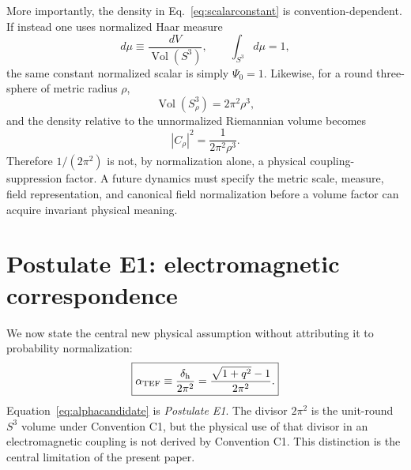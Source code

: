 \documentclass[10pt,twocolumn]{article}
\newcommand{\TEF}{\mathrm{TEF}}
\newcommand{\Vol}{\operatorname{Vol}}
\begin{document}
More importantly, the density in Eq.~\eqref{eq:scalarconstant} is convention-dependent.  If instead
one uses normalized Haar measure
\begin{equation}
d\mu\equiv\frac{dV}{\Vol(S^3)},
\qquad
\int_{S^3}d\mu=1,
\end{equation}
the same constant normalized scalar is simply $\Psi_0=1$.  Likewise, for a round three-sphere of
metric radius $\rho$,
\begin{equation}
\Vol(S^3_\rho)=2\pi^2\rho^3,
\end{equation}
and the density relative to the unnormalized Riemannian volume becomes
\begin{equation}
|C_\rho|^2=\frac{1}{2\pi^2\rho^3}.
\label{eq:rhoscale}
\end{equation}
Therefore $1/(2\pi^2)$ is not, by normalization alone, a physical coupling-suppression factor.
A future dynamics must specify the metric scale, measure, field representation, and canonical field
normalization before a volume factor can acquire invariant physical meaning.

\section{Postulate E1: electromagnetic correspondence}
\label{sec:e1}

We now state the central new physical assumption without attributing it to probability normalization:
\begin{equation}
\boxed{
\alpha_{\TEF}\equiv
\frac{\delta_{\rm h}}{2\pi^2}
=\frac{\sqrt{1+q^2}-1}{2\pi^2}.
}
\label{eq:alphacandidate}
\end{equation}
Equation~\eqref{eq:alphacandidate} is \emph{Postulate E1}.  The divisor $2\pi^2$ is the unit-round
$S^3$ volume under Convention C1, but the physical use of that divisor in an electromagnetic
coupling is not derived by Convention C1.  This distinction is the central limitation of the present
paper.
\end{document}
